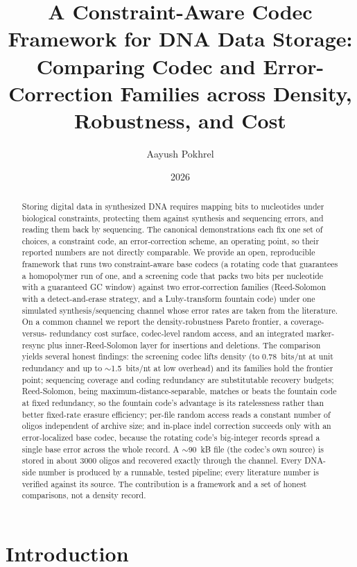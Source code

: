 \documentclass[11pt]{article}
\title{A Constraint-Aware Codec Framework for DNA Data Storage:\\
Comparing Codec and Error-Correction Families across Density, Robustness, and Cost}
\author{Aayush Pokhrel}
\affil{\texttt{aayushpokhrel1} (GitHub); repository \texttt{dna-data-storage}}
\date{2026}
\begin{document}
\maketitle

\begin{abstract}
Storing digital data in synthesized DNA requires mapping bits to nucleotides under
biological constraints, protecting them against synthesis and sequencing errors, and
reading them back by sequencing. The canonical demonstrations each fix one set of
choices, a constraint code, an error-correction scheme, an operating point, so their
reported numbers are not directly comparable. We provide an open, reproducible
framework that runs two constraint-aware base codecs (a rotating code that guarantees a
homopolymer run of one, and a screening code that packs two bits per nucleotide with a
guaranteed GC window) against two error-correction families (Reed-Solomon with a
detect-and-erase strategy, and a Luby-transform fountain code) under one simulated
synthesis/sequencing channel whose error rates are taken from the literature. On a
common channel we report the density-robustness Pareto frontier, a coverage-versus-
redundancy cost surface, codec-level random access, and an integrated marker-resync
plus inner-Reed-Solomon layer for insertions and deletions. The comparison yields
several honest findings: the screening codec lifts density (to \num{0.78}~bits/nt at
unit redundancy and up to $\sim$\num{1.5}~bits/nt at low overhead) and its families hold
the frontier point; sequencing coverage and coding redundancy are substitutable recovery
budgets; Reed-Solomon, being maximum-distance-separable, matches or beats the fountain
code at fixed redundancy, so the fountain code's advantage is its ratelessness rather
than better fixed-rate erasure efficiency; per-file random access reads a constant
number of oligos independent of archive size; and in-place indel correction succeeds
only with an error-localized base codec, because the rotating code's big-integer
records spread a single base error across the whole record. A $\sim$\num{90}~kB file (the
codec's own source) is stored in about 3000 oligos and recovered exactly through the
channel. Every DNA-side number is produced by a runnable, tested pipeline; every
literature number is verified against its source. The contribution is a framework and a
set of honest comparisons, not a density record.
\end{abstract}

\section{Introduction}
\end{document}
